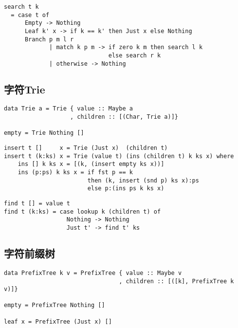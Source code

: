 \documentclass{ctexart}
\begin{document}
\lstset{language=Haskell}
\begin{lstlisting}[caption=整数前缀树的查找]
search t k
  = case t of
      Empty -> Nothing
      Leaf k' x -> if k == k' then Just x else Nothing
      Branch p m l r
             | match k p m -> if zero k m then search l k
                              else search r k
             | otherwise -> Nothing
\end{lstlisting}

\subsection{字符Trie}

\lstset{language=Haskell}
\begin{lstlisting}[caption=字符Trie的定义]
data Trie a = Trie { value :: Maybe a
                   , children :: [(Char, Trie a)]}

empty = Trie Nothing []
\end{lstlisting}

\lstset{language=Haskell}
\begin{lstlisting}[caption=字符Trie的插入]
insert t []     x = Trie (Just x)  (children t)
insert t (k:ks) x = Trie (value t) (ins (children t) k ks x) where
    ins [] k ks x = [(k, (insert empty ks x))]
    ins (p:ps) k ks x = if fst p == k
                        then (k, insert (snd p) ks x):ps
                        else p:(ins ps k ks x)
\end{lstlisting}

\lstset{language=Haskell}
\begin{lstlisting}[caption=字符Trie的查找]
find t [] = value t
find t (k:ks) = case lookup k (children t) of
                  Nothing -> Nothing
                  Just t' -> find t' ks
\end{lstlisting}

\subsection{字符前缀树}

\lstset{language=Haskell}
\begin{lstlisting}[caption=字符前缀树的定义]
data PrefixTree k v = PrefixTree { value :: Maybe v
                                 , children :: [([k], PrefixTree k v)]}

empty = PrefixTree Nothing []

leaf x = PrefixTree (Just x) []
\end{lstlisting}
\end{document}
